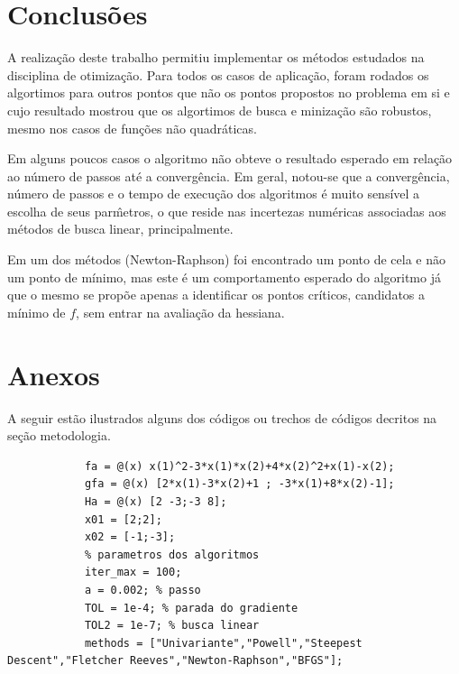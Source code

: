 \documentclass[10pt, a4paper]{article}
\begin{document}
\section{Conclus\~oes}

A realiza\c c\~ao deste trabalho permitiu implementar os m\'etodos estudados na disciplina de otimiza\c c\~ao. Para todos os casos de aplica\c c\~ao, foram rodados os algortimos para outros pontos que n\~ao os pontos propostos no problema em si e cujo resultado mostrou que os algortimos de busca e miniza\c c\~ao s\~ao robustos, mesmo nos casos de fun\c c\~oes n\~ao quadr\'aticas.

Em alguns poucos casos o algoritmo n\~ao obteve o resultado esperado em rela\c c\~ao ao n\'umero de passos at\'e a converg\^encia. Em geral, notou-se que a converg\^encia, n\'umero de passos e o tempo de execu\c c\~ao dos algoritmos \'e muito sens\'ivel a escolha de seus par\^metros, o que reside nas incertezas num\'ericas associadas aos m\'etodos de busca linear, principalmente.

Em um dos m\'etodos (Newton-Raphson) foi encontrado um ponto de cela e n\~ao um ponto de m\'inimo, mas este \'e um comportamento esperado do algoritmo j\'a que o mesmo se prop\~oe apenas a identificar os pontos cr\'iticos, candidatos a m\'inimo de $f$, sem entrar na avalia\c c\~ao da hessiana.

\section{Anexos}

A seguir est\~ao ilustrados alguns dos c\'odigos ou trechos de c\'odigos decritos na se\c c\~ao metodologia.

\begin{minipage}{\linewidth}
      \begin{lstlisting}[style=myStyle, caption=script t01.m setando par\^ametros e criando as fun\c c\~oes, label=l1]
            % dados do item 01a, f, grad f, hess f e x0
            fa = @(x) x(1)^2-3*x(1)*x(2)+4*x(2)^2+x(1)-x(2);
            gfa = @(x) [2*x(1)-3*x(2)+1 ; -3*x(1)+8*x(2)-1];
            Ha = @(x) [2 -3;-3 8];
            x01 = [2;2];
            x02 = [-1;-3];
            % parametros dos algoritmos
            iter_max = 100;
            a = 0.002; % passo
            TOL = 1e-4; % parada do gradiente
            TOL2 = 1e-7; % busca linear
            methods = ["Univariante","Powell","Steepest Descent","Fletcher Reeves","Newton-Raphson","BFGS"];
      \end{lstlisting}
\end{minipage}
\end{document}
